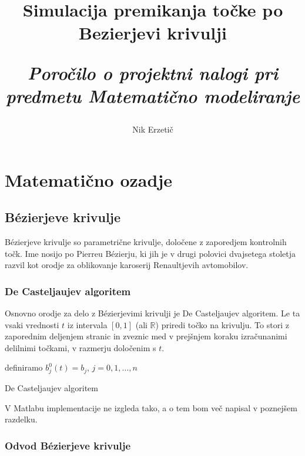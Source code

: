 \documentclass[a4paper,12pt]{article}
\title{\textbf{\huge Simulacija premikanja točke po Bezierjevi krivulji}
	
	\Large \it Poročilo o projektni nalogi pri predmetu Matematično modeliranje}
\author{Nik Erzetič}
\begin{document}
	
	\maketitle
	
	\tableofcontents
	
	\section{Matematično ozadje}
	
	\subsection{B\'{e}zierjeve krivulje}
	
	B\'{e}zierjeve krivulje so parametrične krivulje, določene z zaporedjem kontrolnih točk. Ime nosijo po Pierreu B\'ezierju, ki jih je v drugi polovici dvajsetega stoletja razvil kot orodje za oblikovanje karoserij Renaultjevih avtomobilov.
	
	\subsubsection{De Casteljaujev algoritem}
	
	Osnovno orodje za delo z B\'ezierjevimi krivulji je De Casteljaujev algoritem. Le ta vsaki vrednosti $t$ iz intervala $[0,1]$ (ali $\mathbb{R}$) priredi točko na krivulju. To stori z zaporednim deljenjem stranic in zveznic med v prejšnjem koraku izračunanimi delilnimi točkami, v razmerju določenim s $t$. 
	
	\vspace{3mm}
	\begin{algorithm}[H]
		definiramo $b_j^0(t) = b_j$, $j=0,1,\ldots,n$
		
		\caption{De Casteljaujev algoritem}
	\end{algorithm}
	\vspace{3mm}
	
	V Matlabu implementacije ne izgleda tako, a o tem bom več napisal v poznejšem razdelku.
	
	\subsubsection{Odvod B\'{e}zierjeve krivulje}
	
\end{document}

